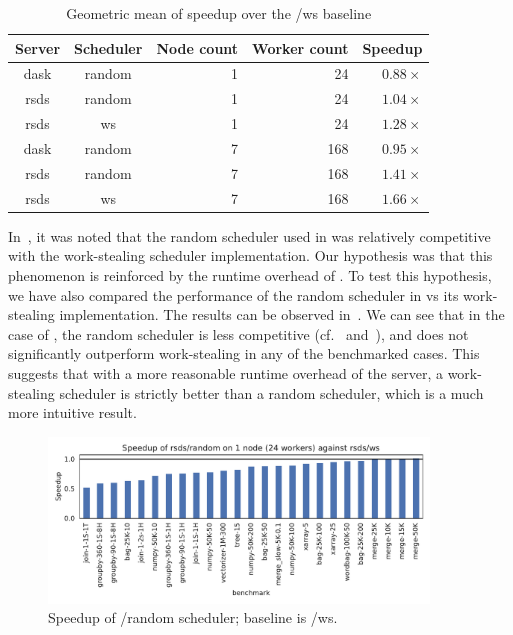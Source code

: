 \setlength{\tabcolsep}{5pt}
\begin{table}
	\centering
	\begin{tabular}{c|c|r|r|r}
		\textbf{Server} & \textbf{Scheduler} & \textbf{Node count} & \textbf{Worker	count} &
		\textbf{Speedup}                                                                                 \\
		\midrule
		dask            & random             & 1                   & 24                   & $0.88\times$ \\
		rsds            & random             & 1                   & 24                   & $1.04\times$ \\
		rsds            & ws                 & 1                   & 24                   & $1.28\times$ \\
		dask            & random             & 7                   & 168                  & $0.95\times$ \\
		rsds            & random             & 7                   & 168                  & $1.41\times$ \\
		rsds            & ws                 & 7                   & 168                  & $1.66\times$ \\
	\end{tabular}
	\caption{Geometric mean of speedup over the \dask{}/ws baseline}
	\label{tab:rsds-geom-mean-speedup}
\end{table}

In~, it was noted that the random scheduler used in
\dask{} was relatively competitive with the work-stealing scheduler implementation.
Our hypothesis was that this phenomenon is reinforced by the runtime overhead of
\dask{}. To test this hypothesis, we have also compared the performance of the
random scheduler in \rsds{} vs its work-stealing implementation. The results
can be observed in~. We can see that in the case of
\rsds{}, the random scheduler is less competitive
(cf.~ and~), and does not significantly
outperform work-stealing in any of the benchmarked cases. This suggests that with a more reasonable
runtime overhead of the server, a work-stealing scheduler is strictly better than a random
scheduler, which is a much more intuitive result.

\begin{figure}
	\centering
	\includegraphics[width=0.9\textwidth]{./imgs/rsds/charts/speedup-rsds-random-1-baseline-rsds-ws}
	\caption{Speedup of \rsds{}/random scheduler; baseline is \rsds{}/ws.}
	\label{fig:rsds-random-baseline}
\end{figure}

